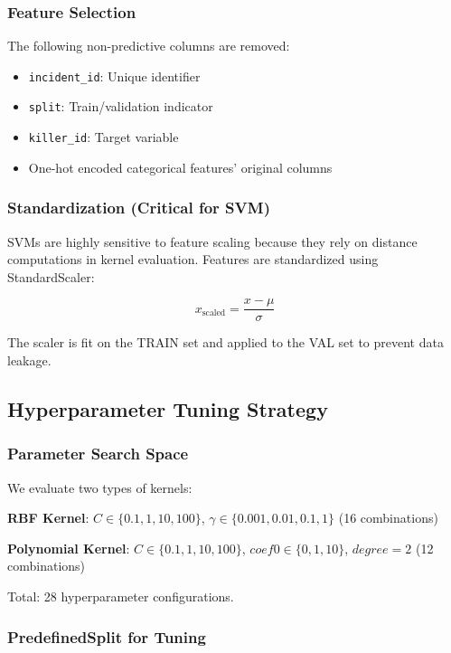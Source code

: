 \documentclass[12pt]{article}
\begin{document}
\subsubsection{Feature Selection}

The following non-predictive columns are removed:
\begin{itemize}
    \item \texttt{incident\_id}: Unique identifier
    \item \texttt{split}: Train/validation indicator
    \item \texttt{killer\_id}: Target variable
    \item One-hot encoded categorical features' original columns
\end{itemize}

\subsubsection{Standardization (Critical for SVM)}

SVMs are highly sensitive to feature scaling because they rely on distance computations in kernel evaluation. Features are standardized using StandardScaler:

\begin{equation}
x_{\text{scaled}} = \frac{x - \mu}{\sigma}
\end{equation}

The scaler is fit on the TRAIN set and applied to the VAL set to prevent data leakage.

\subsection{Hyperparameter Tuning Strategy}

\subsubsection{Parameter Search Space}

We evaluate two types of kernels:

\textbf{RBF Kernel}: $C \in \{0.1, 1, 10, 100\}$, $\gamma \in \{0.001, 0.01, 0.1, 1\}$ (16 combinations)

\textbf{Polynomial Kernel}: $C \in \{0.1, 1, 10, 100\}$, $coef0 \in \{0, 1, 10\}$, $degree = 2$ (12 combinations)

Total: 28 hyperparameter configurations.

\subsubsection{PredefinedSplit for Tuning}
\end{document}
